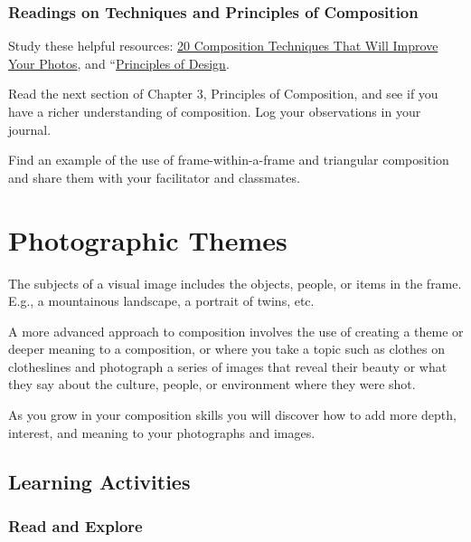 \documentclass[
]{book}
\begin{document}
\hypertarget{readings-on-techniques-and-principles-of-composition}{%
\subsubsection*{Readings on Techniques and Principles of Composition}\label{readings-on-techniques-and-principles-of-composition}}

Study these helpful resources: \href{https://petapixel.com/2016/09/14/20-composition-techniques-will-improve-photos/}{20 Composition Techniques That Will Improve Your Photos}, and ``\href{https://www.getty.edu/education/teachers/building_lessons/principles_design.pdf}{Principles of Design}.

Read the next section of Chapter 3, Principles of Composition, and see if you have a richer understanding of composition. Log your observations in your journal.

Find an example of the use of frame-within-a-frame and triangular composition and share them with your facilitator and classmates.

\hypertarget{photographic-themes}{%
\section{Photographic Themes}\label{photographic-themes}}

The subjects of a visual image includes the objects, people, or items in the frame. E.g., a mountainous landscape, a portrait of twins, etc.

A more advanced approach to composition involves the use of creating a theme or deeper meaning to a composition, or where you take a topic such as clothes on clotheslines and photograph a series of images that reveal their beauty or what they say about the culture, people, or environment where they were shot.

As you grow in your composition skills you will discover how to add more depth, interest, and meaning to your photographs and images.

\hypertarget{learning-activities-11}{%
\subsection*{Learning Activities}\label{learning-activities-11}}

\hypertarget{read-and-explore}{%
\subsubsection*{Read and Explore}\label{read-and-explore}}
\end{document}
